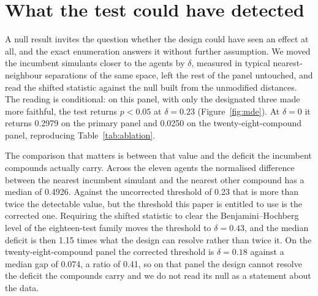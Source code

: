 \documentclass[journal=jacsat,manuscript=suppinfo,margin=1in]{achemso}
\begin{document}
\section{What the test could have detected}
\label{res:mde}

A null result invites the question whether the design could have seen an effect
at all, and the exact enumeration answers it without further assumption. We
moved the incumbent simulants closer to the agents by $\delta$, measured in
typical nearest-neighbour separations of the same space, left the rest of the
panel untouched, and read the shifted statistic against the null built from the
unmodified distances. The reading is conditional: on this panel, with only the
designated three made more faithful, the test returns $p<0.05$ at
$\delta = 0.23$ (Figure~\ref{fig:mde}). At $\delta = 0$ it returns 0.2979 on
the primary panel and 0.0250 on the twenty-eight-compound panel, reproducing
Table~\ref{tab:ablation}.

The comparison that matters is between that value and the deficit the incumbent
compounds actually carry. Across the eleven agents the normalised difference
between the nearest incumbent simulant and the nearest other compound has a
median of 0.4926. Against the uncorrected threshold of 0.23 that is more than
twice the detectable value, but the threshold this paper is entitled to use is
the corrected one. Requiring the shifted statistic to clear the
Benjamini--Hochberg level of the eighteen-test family moves the threshold to
$\delta = 0.43$, and the median deficit is then 1.15 times what the design can
resolve rather than twice it. On the twenty-eight-compound panel the corrected
threshold is $\delta = 0.18$ against a median gap of 0.074, a ratio of 0.41,
so on that panel the design cannot resolve the deficit the compounds carry and
we do not read its null as a statement about the data.
\end{document}

